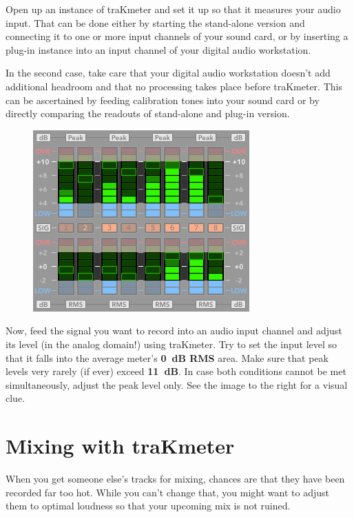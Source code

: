 Open up an instance of traKmeter and set it up so that it measures
your audio input.  That can be done either by starting the stand-alone
version and connecting it to one or more input channels of your sound
card, or by inserting a plug-in instance into an input channel of your
digital audio workstation.

In the second case, take care that your digital audio workstation
doesn't add additional headroom and that no processing takes place
before traKmeter.  This can be ascertained by feeding calibration
tones into your sound card or by directly comparing the readouts of
stand-alone and plug-in version.

\begin{figure}
\includegraphics[scale=0.45,clip]{include/images/trakmeter_optimal.png}
\end{figure}

Now, feed the signal you want to record into an audio input channel
and adjust its level (in the analog domain!) using traKmeter.  Try to
set the input level so that it falls into the average meter's
\textbf{\SI{0}{\dB} RMS} area.  Make sure that peak levels very rarely
(if ever) exceed \textbf{\SI[retain-explicit-plus]{+11}{\dB}}.  In
case both conditions cannot be met simultaneously, adjust the peak
level only.  See the image to the right for a visual clue.

\section{Mixing with traKmeter}
\label{sec:mixing_with_trakmeter}

When you get someone else's tracks for mixing, chances are that they
have been recorded far too hot.  While you can't change that, you
might want to adjust them to optimal loudness so that your upcoming
mix is not ruined.

